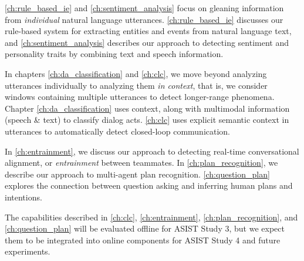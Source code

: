 \autoref{ch:rule_based_ie} and \autoref{ch:sentiment_analysis} focus on
gleaning information from \emph{individual} natural language utterances.
\autoref{ch:rule_based_ie} discusses our rule-based system for extracting
entities and events from natural language text, and
\autoref{ch:sentiment_analysis} describes our approach to detecting sentiment
and personality traits by combining text and speech information.

In chapters \autoref{ch:da_classification} and \autoref{ch:clc}, we move beyond
analyzing utterances individually to analyzing them \emph{in context}, that is,
we consider windows containing multiple utterances to detect longer-range
phenomena. Chapter \autoref{ch:da_classification} uses context, along with
multimodal information (speech \& text) to classify dialog acts.
\autoref{ch:clc} uses explicit semantic context in utterances to automatically
detect closed-loop communication.

In \autoref{ch:entrainment}, we discuss our approach to detecting real-time
conversational alignment, or \emph{entrainment} between teammates. In
\autoref{ch:plan_recognition}, we describe our approach to multi-agent plan
recognition. \autoref{ch:question_plan} explores the connection between
question asking and inferring human plans and intentions. 

The capabilities described in \autoref{ch:clc}, \autoref{ch:entrainment},
\autoref{ch:plan_recognition}, and \autoref{ch:question_plan} will be evaluated
offline for ASIST Study 3, but we expect them to be integrated into online
components for ASIST Study 4 and future experiments.
